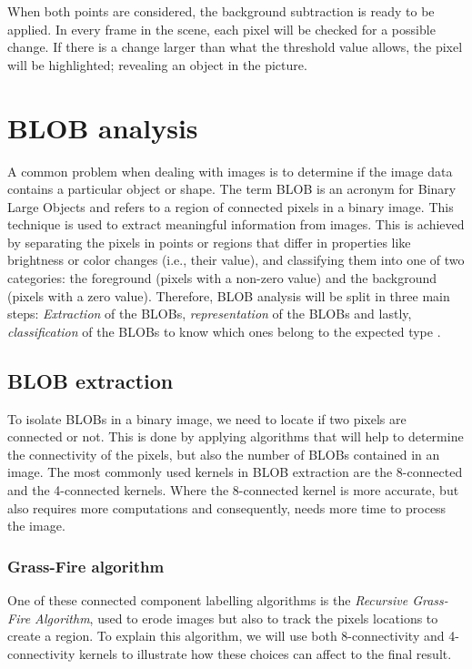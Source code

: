 When both points are considered, the background subtraction is ready to be applied. In every frame in the scene, each pixel will be checked for a possible change. If there is a change larger than what the threshold value allows, the pixel will be highlighted; revealing an object in the picture.



\section{BLOB analysis}
A common problem when dealing with images is to determine if the image data contains a particular object or shape. The term BLOB is an acronym for Binary Large Objects and refers to a region of connected pixels in a binary image. This technique is used to extract meaningful information from images. This is achieved by separating the pixels in points or regions that differ in properties like brightness or color changes (i.e., their value), and classifying them into one of two categories: the foreground (pixels with a non-zero value) and the background (pixels with a zero value).
Therefore, BLOB analysis will be split in three main steps: \textit{Extraction} of the BLOBs, \textit{representation} of the BLOBs and lastly, \textit{classification} of the BLOBs to know which ones belong to the expected type \citep{ip_book}.

\subsection{BLOB extraction}
To isolate BLOBs in a binary image, we need to locate if two pixels are connected or not. This is done by applying algorithms that will help to determine the connectivity of the pixels, but also the number of BLOBs contained in an image. The most commonly used kernels in BLOB extraction are the 8-connected and the 4-connected kernels. Where the 8-connected kernel is more accurate, but also requires more computations and consequently, needs more time to process the image.

\subsubsection{Grass-Fire algorithm}
One of these connected component labelling algorithms is the \textit{Recursive Grass-Fire Algorithm}, used to erode images but also to track the pixels locations to create a region.
To explain this algorithm, we will use both 8-connectivity and 4-connectivity kernels to illustrate how these choices can affect to the final result.

